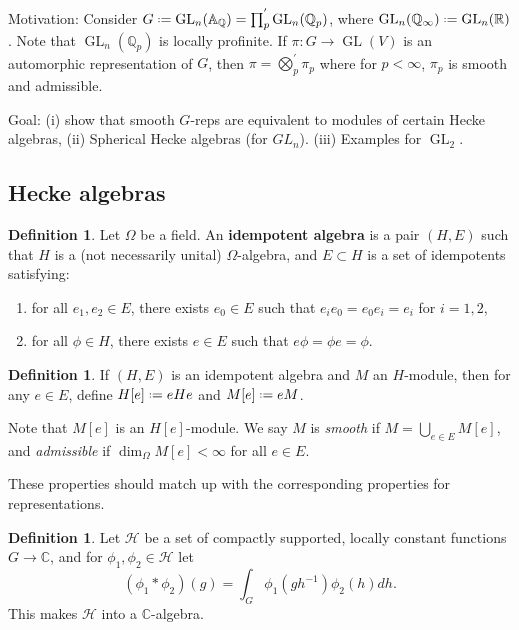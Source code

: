 \documentclass[11pt]{report}
\let\mbb\mathbb
\let\mc\mathcal
\newcommand{\1}{\mathbbm 1}
\newcommand{\Q}{\mathbb{Q}}
\newcommand{\R}{\mathbb{R}}
\newcommand{\C}{\mathbb{C}}
\newcommand{\A}{\mbb A}
\newcommand*{\defeq}{\mathrel{\vcenter{\baselineskip0.5ex \lineskiplimit0pt
      \hbox{\scriptsize.}\hbox{\scriptsize.}}}%
  =}
\DeclareMathOperator{\GL}{GL}
\theoremstyle{plain}
\newcounter{ex}
\theoremstyle{definition}
\newtheorem{mydef}[thm]{Definition}
\theoremstyle{remark}
\numberwithin{equation}{section}
\begin{document}
Motivation:
Consider $ G \defeq \GL_{n}(\A_{\Q}) = \prod_{p}^{'} \GL_{n}(\Q_{p})$,
where $\GL_{n}(\Q_{\infty}) \defeq \GL_{n}(\R)$. Note that
$\GL_{n}(\Q_{p})$ is locally profinite. If $\pi \colon G \to \GL(V)$ is an
automorphic representation of $G$, then
$\pi = \bigotimes_{p}^{'} \pi_{p}$ where for $p< \infty$, $\pi_{p}$ is smooth and
admissible.

Goal: (i) show that smooth $G$-reps are equivalent to modules of
certain Hecke algebras,
(ii) Spherical Hecke algebras (for $GL_n$).
(iii) Examples for $\GL_{2}$.

\subsection{Hecke algebras}
\label{sec:hecke-algebras}

\begin{mydef}
  Let $\Omega$ be a field. An \textbf{idempotent algebra} is a pair $(H,E)$
  such that $H$ is a (not necessarily unital) $\Omega$-algebra, and $E \subset H$
  is a set of idempotents satisfying:
  \begin{enumerate}
  \item for all $e_{1},e_{2} \in E$, there exists $e_{0} \in E$ such that
    $e_{i}e_{0} = e_{0}e_{i} = e_{i}$ for $i =1,2$,
  \item for all $\phi \in H$, there exists $e \in E$ such that $e\phi = \phi e =
    \phi$. 
  \end{enumerate}
\end{mydef}

\begin{mydef}
If $(H,E)$ is an idempotent algebra and $M$ an $H$-module, then for any
$e \in E$, define $H[e] \defeq eHe$ and $M[e] \defeq eM$. 
\end{mydef}
Note that $M[e]$ is an $H[e]$-module. We say $M$ is \emph{smooth} if
$M = \bigcup_{e \in E} M[e]$, and \emph{admissible} if $\dim_{\Omega}M[e] < \infty$ for
all $e \in E$.

These properties should match up with the corresponding properties for
representations.

\begin{mydef}
  Let $\mc H$ be a set of compactly supported, locally constant
  functions $G \to \C$, and for $\phi_{1},\phi_{2} \in \mc H$ let
  \begin{equation}
    \label{eq:6}
    (\phi_{1} \ast \phi_{2}) (g) = \int_{G} \phi_{1}(gh^{-1})\phi_{2}(h)dh.
  \end{equation}
  This makes $\mc H$ into a $\C$-algebra.
\end{mydef}
\end{document}
